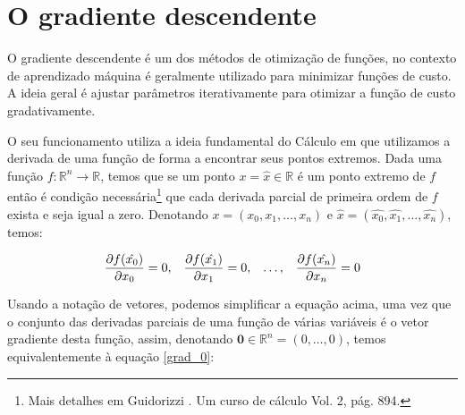 


% 

\chapter{O gradiente descendente}
\label{ap:gradiente}

O gradiente descendente é um dos métodos de otimização de funções, no contexto de aprendizado máquina é geralmente utilizado para minimizar funções de custo. A ideia geral é ajustar parâmetros iterativamente para otimizar a função de custo gradativamente. 

O seu funcionamento utiliza a ideia fundamental do Cálculo em que utilizamos a derivada de uma função de forma a encontrar seus pontos extremos. Dada uma função $f{:}\mathbb{R}^n \rightarrow \mathbb{R}$, temos que se um ponto $x = \hat{x} \in \mathbb{R}$ é um ponto extremo de $f$ então é condição necessária\footnote{Mais detalhes em Guidorizzi \citep{guidorizzi2}. Um curso de cálculo Vol. 2, pág. 894.} que cada derivada parcial de primeira ordem de $f$ exista e seja igual a zero. Denotando $x = (x_0, x_1, \ldots, x_n)$ e $\hat{x} = (\hat{x_0}, \hat{x_1}, \ldots, \hat{x_n})$, temos:

\begin{equation}\label{grad_0}
\frac{\partial f(\hat{x_0})}{\partial x_0} = 0 ,\;\;\; \frac{\partial f(\hat{x_1})}{\partial x_1} = 0 ,\;\;\; \ldots ,\;\;\; \frac{\partial f(\hat{x_n})}{\partial x_n} = 0
\end{equation}

Usando a notação de vetores, podemos simplificar a equação acima, uma vez que o conjunto das derivadas parciais de uma função de várias variáveis é o vetor gradiente desta função, assim, denotando $\mathbf{0} \in \mathbb{R}^n = (0, \ldots, 0)$, temos equivalentemente à equação \ref{grad_0}:

